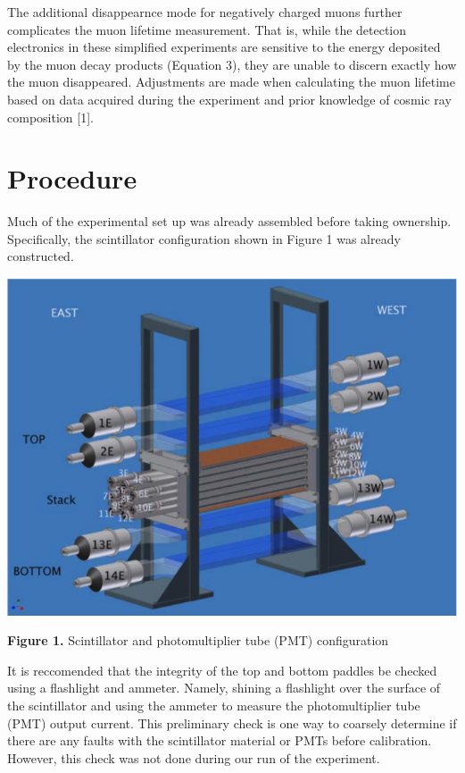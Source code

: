 \documentclass{article}
\begin{document}
The additional disappearnce mode for negatively charged muons further complicates the muon lifetime measurement. That is, while the detection electronics in these simplified experiments are sensitive to the energy deposited by the muon decay products (Equation 3), they are unable to discern exactly how the muon disappeared. Adjustments are made when calculating the muon lifetime based on data acquired during the experiment and prior knowledge of cosmic ray composition [1]. %

\section*{Procedure}
\hspace{3.5mm} Much of the experimental set up was already assembled before taking ownership. Specifically, the scintillator configuration shown in Figure 1 was already constructed.  

\begin{center}

    \vspace{5mm}
    
    \includegraphics[width = \textwidth]{Figure1.png}   
    
    \vspace{5mm}
    
    \textbf{Figure 1.} Scintillator and photomultiplier tube (PMT) configuration
    
\end{center}

It is reccomended that the integrity of the top and bottom paddles be checked using a flashlight and ammeter. Namely, shining a flashlight over the surface of the scintillator and using the ammeter to measure the photomultiplier tube (PMT) output current. This preliminary check is one way to coarsely determine if there are any faults with the scintillator material or PMTs before calibration. However, this check was not done during our run of the experiment. 
\end{document}
